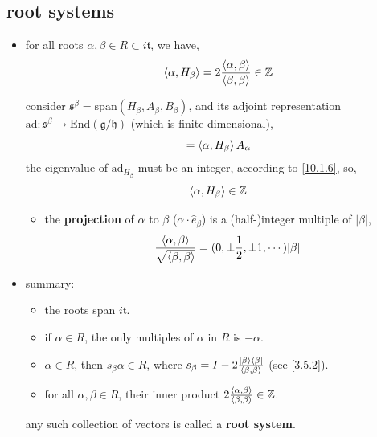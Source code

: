 \subsection{root systems}
\begin{itemize}
	\item for all roots $\alpha, \beta \in R \subset i \mathfrak{t}$, we have,
	\begin{equation}
		\braket{\alpha, H_\beta} = 2 \frac{\braket{\alpha, \beta}}{\braket{\beta, \beta}} \in \mathbb{Z}
	\end{equation}
	
	\begin{tcolorbox}[title=proof:]
		consider $\mathfrak{s}^\beta = \mathrm{span}(H_\beta, A_\beta, B_\beta)$, and its adjoint representation $\mathrm{ad} : \mathfrak{s}^\beta \rightarrow \mathrm{End}(\mathfrak{g} / \mathfrak{h})$ (which is finite dimensional),
		\begin{equation}
			[H_\beta, A_\alpha] = \braket{\alpha, H_\beta} A_\alpha
		\end{equation}
		the eigenvalue of $\mathrm{ad}_{H_\beta}$ must be an integer, according to \eqref{10.1.6}, so,
		\begin{equation}
			\braket{\alpha, H_\beta} \in \mathbb{Z}
		\end{equation}
	\end{tcolorbox}
	
	\begin{itemize}
		\item the \textbf{projection} of $\alpha$ to $\beta$ ($\alpha \cdot \hat{e}_\beta$) is a (half-)integer multiple of $|\beta|$,
		\begin{equation}
			\frac{\braket{\alpha, \beta}}{\sqrt{\braket{\beta, \beta}}} = (0, \pm \frac{1}{2}, \pm 1, \cdots) |\beta|
		\end{equation}
	\end{itemize}
	
	\item summary:
	\begin{itemize}
		\item the roots span $i \mathfrak{t}$.
		
		\item if $\alpha \in R$, the only multiples of $\alpha$ in $R$ is $- \alpha$.
		
		\item $\alpha \in R$, then $s_\beta \alpha \in R$, where $s_\beta = I - 2 \frac{\ket{\beta} \bra{\beta}}{\braket{\beta, \beta}}$ (see \eqref{3.5.2}).
		
		\item for all $\alpha, \beta \in R$, their inner product $2 \frac{\braket{\alpha, \beta}}{\braket{\beta, \beta}} \in \mathbb{Z}$.
	\end{itemize}
	any such collection of vectors is called a \textbf{root system}.
\end{itemize}

